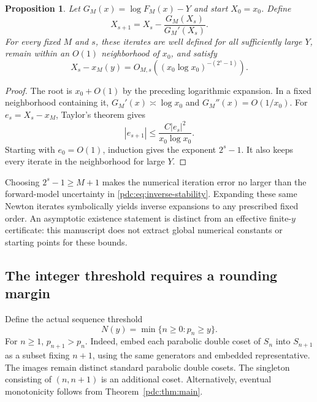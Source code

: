 \documentclass[11pt,letterpaper]{article}
\newtheorem{proposition}[theorem]{Proposition}
\theoremstyle{remark}\newtheorem{remark}[theorem]{Remark}
\begin{document}
\begin{proposition}\label{pdc:prop:newton}
Let $G_M(x)=\log F_M(x)-Y$ and start $X_0=x_0$. Define
\begin{equation}\label{pdc:eq:newton}
 X_{s+1}=X_s-\frac{G_M(X_s)}{G_M'(X_s)}.
\end{equation}
For every fixed $M$ and $s$, these iterates are well defined for all sufficiently large $Y$, remain within an $O(1)$ neighborhood of $x_0$, and satisfy
\begin{equation}\label{pdc:eq:newton-error}
 X_s-x_M(y)=O_{M,s}\!\left((x_0\log x_0)^{-(2^s-1)}\right).
\end{equation}
\end{proposition}
\begin{proof}
The root is $x_0+O(1)$ by the preceding logarithmic expansion. In a fixed neighborhood containing it, $G_M'(x)\asymp\log x_0$ and $G_M''(x)=O(1/x_0)$. For $e_s=X_s-x_M$, Taylor's theorem gives
\[
 |e_{s+1}|\leq \frac{C|e_s|^2}{x_0\log x_0}.
\]
Starting with $e_0=O(1)$, induction gives the exponent $2^s-1$. It also keeps every iterate in the neighborhood for large $Y$.
\end{proof}
Choosing $2^s-1\geq M+1$ makes the numerical iteration error no larger than the forward-model uncertainty in \eqref{pdc:eq:inverse-stability}. Expanding these same Newton iterates symbolically yields inverse expansions to any prescribed fixed order. An asymptotic existence statement is distinct from an effective finite-$y$ certificate: this manuscript does not extract global numerical constants or starting points for these bounds.

\subsection{The integer threshold requires a rounding margin}
Define the actual sequence threshold
\[
 N(y)=\min\{n\geq0:p_n\geq y\}.
\]
For $n\geq1$, $p_{n+1}>p_n$. Indeed, embed each parabolic double coset of $S_n$ into $S_{n+1}$ as a subset fixing $n+1$, using the same generators and embedded representative. The images remain distinct standard parabolic double cosets. The singleton consisting of $(n,n+1)$ is an additional coset. Alternatively, eventual monotonicity follows from Theorem~\ref{pdc:thm:main}.
\end{document}
